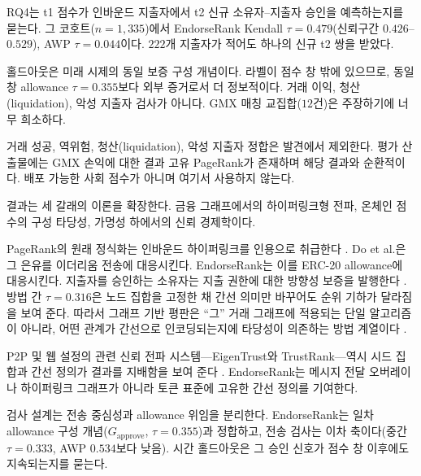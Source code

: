 RQ4는 t1 점수가 인바운드 지출자에서 t2 신규 소유자--지출자 승인을 예측하는지를 묻는다. 그 코호트($n=1{,}335$)에서 EndorseRank Kendall $\tau=0.479$(신뢰구간 $0.426$--$0.529$), AWP $\tau=0.044$이다. $222$개 지출자가 적어도 하나의 신규 t2 쌍을 받았다.

홀드아웃은 미래 시제의 동일 보증 구성 개념이다. 라벨이 점수 창 밖에 있으므로, 동일 창 allowance $\tau=0.355$보다 외부 증거로서 더 정보적이다. 거래 이익, 청산(liquidation), 악성 지출자 검사가 아니다. GMX 매칭 교집합($12$건)은 주장하기에 너무 희소하다.


거래 성공, 역위험, 청산(liquidation), 악성 지출자 정합은 발견에서 제외한다. 평가 산출물에는 GMX 손익에 대한 결과 고유 PageRank가 존재하며 해당 결과와 순환적이다. 배포 가능한 사회 점수가 아니며 여기서 사용하지 않는다.


결과는 세 갈래의 이론을 확장한다. 금융 그래프에서의 하이퍼링크형 전파, 온체인 점수의 구성 타당성, 가명성 하에서의 신뢰 경제학이다.


PageRank의 원래 정식화는 인바운드 하이퍼링크를 인용으로 취급한다 . Do et al.은 그 은유를 이더리움 전송에 대응시킨다. EndorseRank는 이를 ERC-20 allowance에 대응시킨다. 지출자를 승인하는 소유자는 지출 권한에 대한 방향성 보증을 발행한다 . 방법 간 $\tau=0.316$은 노드 집합을 고정한 채 간선 의미만 바꾸어도 순위 기하가 달라짐을 보여 준다. 따라서 그래프 기반 평판은 ``그'' 거래 그래프에 적용되는 단일 알고리즘이 아니라, 어떤 관계가 간선으로 인코딩되는지에 타당성이 의존하는 방법 계열이다 .

P2P 및 웹 설정의 관련 신뢰 전파 시스템---EigenTrust와 TrustRank---역시 시드 집합과 간선 정의가 결과를 지배함을 보여 준다 . EndorseRank는 메시지 전달 오버레이나 하이퍼링크 그래프가 아니라 토큰 표준에 고유한 간선 정의를 기여한다.


검사 설계는 전송 중심성과 allowance 위임을 분리한다. EndorseRank는 일차 allowance 구성 개념($G_{\text{approve}}$, $\tau=0.355$)과 정합하고, 전송 검사는 이차 축이다(중간 $\tau=0.333$, AWP $0.534$보다 낮음). 시간 홀드아웃은 그 승인 신호가 점수 창 이후에도 지속되는지를 묻는다.


